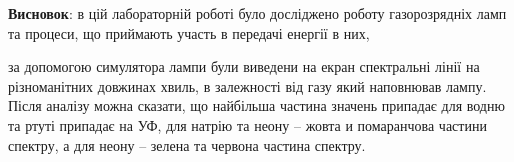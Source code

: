 \documentclass[a4paper,14pt]{extreport}
\begin{document}
\textbf{Висновок}: в цій лабораторній роботі було досліджено роботу газорозрядніх ламп та процеси, що приймають участь в передачі енергії в них, 

за допомогою симулятора лампи  були виведени на екран спектральні лінії на різноманітних довжинах хвиль, в залежності від газу який наповнював лампу. Після аналізу можна сказати, що найбільша частина значень припадає для водню та ртуті припадає на УФ, для натрію та неону -- жовта и помаранчова частини спектру, а для неону -- зелена та червона частина спектру.
\end{document}
